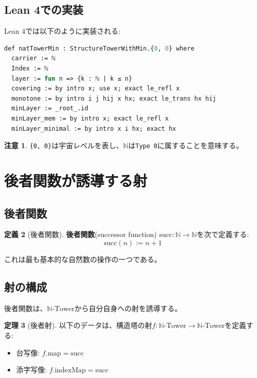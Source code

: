 \documentclass[a4paper,12pt]{article}
\theoremstyle{definition}
\newtheorem{definition}{定義}[section]
\newtheorem{theorem}[definition]{定理}
\newtheorem{remark}[definition]{注意}
\begin{document}
\subsection{Lean 4での実装}

Lean 4では以下のように実装される:

\begin{lstlisting}[style=leanstyle, language=ML]
def natTowerMin : StructureTowerWithMin.{0, 0} where
  carrier := ℕ
  Index := ℕ
  layer := fun n => {k : ℕ | k ≤ n}
  covering := by intro x; use x; exact le_refl x
  monotone := by intro i j hij x hx; exact le_trans hx hij
  minLayer := _root_.id
  minLayer_mem := by intro x; exact le_refl x
  minLayer_minimal := by intro x i hx; exact hx
\end{lstlisting}

\begin{remark}
\texttt{\{0, 0\}}は宇宙レベルを表し、$\mathbb{N}$は\texttt{Type 0}に属することを意味する。
\end{remark}

\section{後者関数が誘導する射}

\subsection{後者関数}

\begin{definition}[後者関数]
\textbf{後者関数}(successor function) $\text{succ} : \mathbb{N} \to \mathbb{N}$を次で定義する:
\[
\text{succ}(n) := n + 1
\]
\end{definition}

これは最も基本的な自然数の操作の一つである。

\subsection{射の構成}

後者関数は、$\mathbb{N}\text{-Tower}$から自分自身への射を誘導する。

\begin{theorem}[後者射]\label{thm:succ_hom}
以下のデータは、構造塔の射$f : \mathbb{N}\text{-Tower} \to \mathbb{N}\text{-Tower}$を定義する:
\begin{itemize}
\item 台写像: $f.\text{map} = \text{succ}$
\item 添字写像: $f.\text{indexMap} = \text{succ}$
\end{itemize}
\end{theorem}
\end{document}

